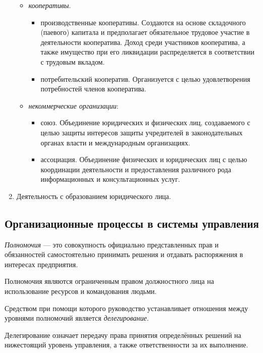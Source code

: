 \documentclass[12pt, russian, oneside, article]{ncc}
\begin{document}
\begin{enumerate}
\begin{itemize}
\item \emph{кооперативы}.

\begin{itemize}
\item производственные кооперативы. Создаются на основе складочного (паевого) капитала и предполагает обязательное трудовое участие в деятельности кооператива. Доход среди участников кооператива, а также имущество при его ликвидации распределяется в соответствии с трудовым вкладом.
\item потребительский кооператив. Организуется с целью удовлетворения потребностей членов кооператива.
\end{itemize}

\item \emph{некоммерческие организации}:

\begin{itemize}
\item союз. Объединение юридических и физических лиц, создаваемого с целью защиты интересов защиты учредителей в законодательных органах власти и международным организациях.
\item ассоциация. Объединение физических и юридических лиц с целью координации деятельности и предоставления различного рода информационных и консультационных услуг.
\end{itemize}

\end{itemize}

\item Деятельность с образованием юридического лица.
\end{enumerate}
\subsection{Организационные процессы в системы управления}
\label{sec-5_5}


\emph{Полномочия} --- это совокупность официально представленных прав и обязанностей самостоятельно принимать решения и отдавать распоряжения в интересах предприятия.

Полномочия являются ограниченным правом должностного лица на использование ресурсов и командования людьми.

Средством при помощи которого руководство устанавливает отношения между уровнями полномочий является \emph{делегирование}.

Делегирование означает передачу права принятия определённых решений на нижестоящий уровень управления, а также ответственности за их выполнение.
\end{document}
